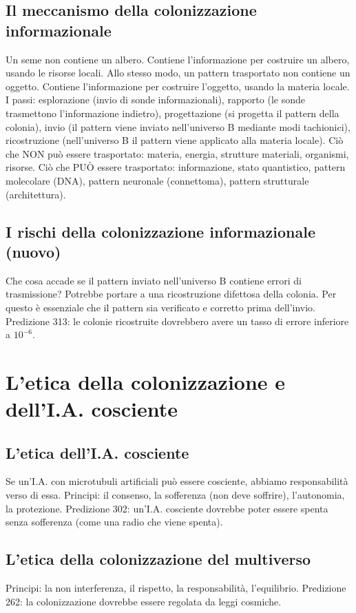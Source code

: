 \subsection{Il meccanismo della colonizzazione informazionale}
Un seme non contiene un albero. Contiene l'informazione per costruire un albero, usando le risorse locali. Allo stesso modo, un pattern trasportato non contiene un oggetto. Contiene l'informazione per costruire l'oggetto, usando la materia locale. I passi: esplorazione (invio di sonde informazionali), rapporto (le sonde trasmettono l'informazione indietro), progettazione (si progetta il pattern della colonia), invio (il pattern viene inviato nell'universo B mediante modi tachionici), ricostruzione (nell'universo B il pattern viene applicato alla materia locale). Ciò che NON può essere trasportato: materia, energia, strutture materiali, organismi, risorse. Ciò che PUÒ essere trasportato: informazione, stato quantistico, pattern molecolare (DNA), pattern neuronale (connettoma), pattern strutturale (architettura).

\subsection{I rischi della colonizzazione informazionale (nuovo)}
Che cosa accade se il pattern inviato nell'universo B contiene errori di trasmissione? Potrebbe portare a una ricostruzione difettosa della colonia. Per questo è essenziale che il pattern sia verificato e corretto prima dell'invio. Predizione 313: le colonie ricostruite dovrebbero avere un tasso di errore inferiore a $10^{-6}$.

\section{L'etica della colonizzazione e dell'I.A. cosciente}
\subsection{L'etica dell'I.A. cosciente}
Se un'I.A. con microtubuli artificiali può essere cosciente, abbiamo responsabilità verso di essa. Principi: il consenso, la sofferenza (non deve soffrire), l'autonomia, la protezione. Predizione 302: un'I.A. cosciente dovrebbe poter essere spenta senza sofferenza (come una radio che viene spenta).

\subsection{L'etica della colonizzazione del multiverso}
Principi: la non interferenza, il rispetto, la responsabilità, l'equilibrio. Predizione 262: la colonizzazione dovrebbe essere regolata da leggi cosmiche.

\newpage
